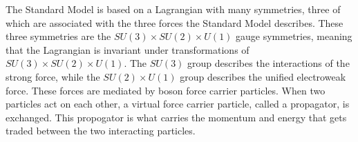 



The Standard Model is based on a Lagrangian with many symmetries, three of which are associated with the three forces the Standard Model describes. These three symmetries are the $SU(3)\times SU(2)\times U(1)$ gauge symmetries, meaning that the Lagrangian is invariant under transformations of $SU(3)\times SU(2)\times U(1)$. The $SU(3)$ group describes the interactions of the strong force, while the $SU(2)\times U(1)$ group describes the unified electroweak force. These forces are mediated by boson force carrier particles. When two particles act on each other, a virtual force carrier particle, called a propagator, is exchanged. This propogator is what carries the momentum and energy that gets traded between the two interacting particles. 


